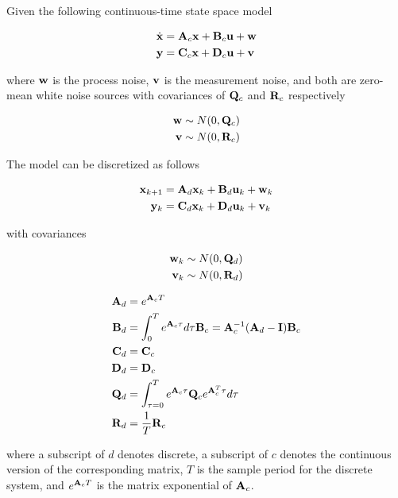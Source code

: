Given the following continuous-time state space model

\begin{align*}
  \dot{\mathbf{x}} &= \mathbf{A}_c\mathbf{x} + \mathbf{B}_c\mathbf{u} + \mathbf{w} \\
  \mathbf{y} &= \mathbf{C}_c\mathbf{x} + \mathbf{D}_c\mathbf{u} + \mathbf{v}
\end{align*}

where $\mathbf{w}$ is the process noise, $\mathbf{v}$ is the measurement noise, and
both are zero-mean white noise sources with covariances of $\mathbf{Q}_c$ and
$\mathbf{R}_c$ respectively

\begin{align*}
  \mathbf{w} &\sim N(0, \mathbf{Q}_c) \\
  \mathbf{v} &\sim N(0, \mathbf{R}_c)
\end{align*}

The model can be discretized as follows

\begin{align*}
  \mathbf{x}_{k+1} &= \mathbf{A}_d \mathbf{x}_k + \mathbf{B}_d \mathbf{u}_k + \mathbf{w}_k \\
   \mathbf{y}_k &= \mathbf{C}_d \mathbf{x}_k + \mathbf{D}_d \mathbf{u}_k + \mathbf{v}_k
\end{align*}

with covariances

\begin{align*}
  \mathbf{w}_k &\sim N(0, \mathbf{Q}_d) \\
  \mathbf{v}_k &\sim N(0, \mathbf{R}_d)
\end{align*}

\begin{theorem}
  \begin{align}
    \mathbf{A}_d &= e^{\mathbf{A}_c T} \\
    \mathbf{B}_d &= \int_0^T e^{\mathbf{A}_c \tau} d\tau \mathbf{B}_c =
      \mathbf{A}_c^{-1} (\mathbf{A}_d - \mathbf{I}) \mathbf{B}_c \\
    \mathbf{C}_d &= \mathbf{C}_c \\
    \mathbf{D}_d &= \mathbf{D}_c \\
    \mathbf{Q}_d &= \int_{\tau = 0}^{T} e^{\mathbf{A}_c\tau} \mathbf{Q}_c
      e^{\mathbf{A}_c^T\tau} d\tau \\
    \mathbf{R}_d &= \frac{1}{T} \mathbf{R}_c
  \end{align}

  where a subscript of $d$ denotes discrete, a subscript of $c$ denotes the
  continuous version of the corresponding matrix, $T$ is the sample period for
  the discrete system, and $e^{\mathbf{A}_c T}$ is the matrix exponential of
  $\mathbf{A}_c$.
\end{theorem}

